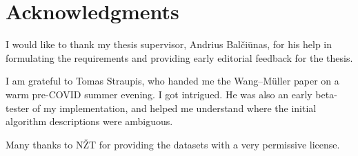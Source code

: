 \documentclass[a4paper]{article}
\newcommand{\WM}{Wang--M{\"u}ller}
\begin{document}
\section{Acknowledgments}
\label{sec:acknowledgments}

I would like to thank my thesis supervisor, Andrius Balčiūnas, for his help in
formulating the requirements and providing early editorial feedback for the
thesis.

I am grateful to Tomas Straupis, who handed me the {\WM}\cite{wang1998line}
paper on a warm pre-COVID summer evening. I got intrigued. He was also an early
beta-tester of my implementation, and helped me understand where the initial
algorithm descriptions were ambiguous.

Many thanks to NŽT for providing the datasets with a very permissive license.

\printbibliography
\end{document}
